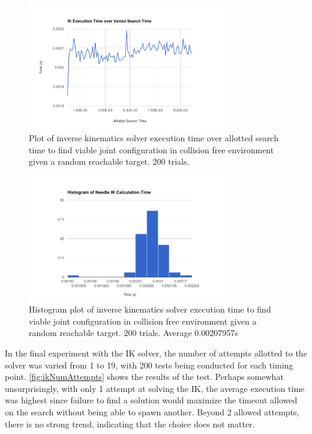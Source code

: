 \documentclass[12pt]{report}
\begin{document}
\begin{figure}[thpb]
	\centering
	\includegraphics[width = 3.5in]{graphs/ik_exec_time_over_allowed.png}
    \caption{Plot of inverse kinematics solver execution time over allotted search time to find viable joint configuration in collision free environment given a random reachable target. 200 trials.}
    \label{fig:ikexeTime}
\end{figure}

\begin{figure}[thpb]
	\centering
	\includegraphics[width = 3.5in]{graphs/ik_hist_1_attempt.png}
    \caption{Histogram plot of inverse kinematics solver execution time to find viable joint configuration in collision free environment given a random reachable target. 200 trials. Average 0.00207957s}
    \label{fig:ikHist}
\end{figure}

In the final experiment with the IK solver, the number of attempts allotted to the solver was varied from 1 to 19, with 200 tests being conducted for each timing point. \autoref{fig:ikNumAttempts} shows the results of the test. Perhaps somewhat unsurprisingly, with only 1 attempt at solving the IK, the average execution time was highest since failure to find a solution would maximize the timeout allowed on the search without being able to spawn another. Beyond 2 allowed attempts, there is no strong trend, indicating that the choice does not matter.
\end{document}
